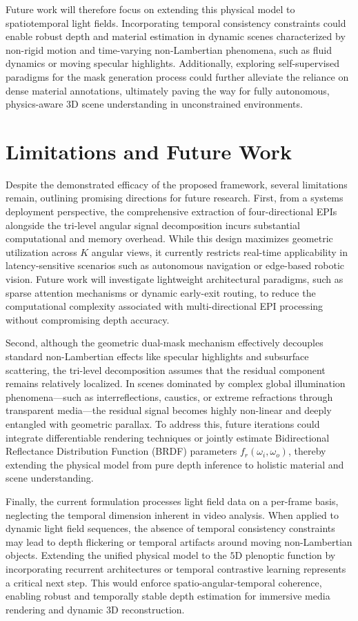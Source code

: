 \documentclass[lettersize,journal]{IEEEtran}
\begin{document}
Future work will therefore focus on extending this physical model to spatiotemporal light fields. Incorporating temporal consistency constraints could enable robust depth and material estimation in dynamic scenes characterized by non-rigid motion and time-varying non-Lambertian phenomena, such as fluid dynamics or moving specular highlights. Additionally, exploring self-supervised paradigms for the mask generation process could further alleviate the reliance on dense material annotations, ultimately paving the way for fully autonomous, physics-aware 3D scene understanding in unconstrained environments.

\section{Limitations and Future Work}

Despite the demonstrated efficacy of the proposed framework, several limitations remain, outlining promising directions for future research. First, from a systems deployment perspective, the comprehensive extraction of four-directional EPIs alongside the tri-level angular signal decomposition incurs substantial computational and memory overhead. While this design maximizes geometric utilization across $K$ angular views, it currently restricts real-time applicability in latency-sensitive scenarios such as autonomous navigation or edge-based robotic vision. Future work will investigate lightweight architectural paradigms, such as sparse attention mechanisms or dynamic early-exit routing, to reduce the computational complexity associated with multi-directional EPI processing without compromising depth accuracy.

Second, although the geometric dual-mask mechanism effectively decouples standard non-Lambertian effects like specular highlights and subsurface scattering, the tri-level decomposition assumes that the residual component remains relatively localized. In scenes dominated by complex global illumination phenomena---such as interreflections, caustics, or extreme refractions through transparent media---the residual signal becomes highly non-linear and deeply entangled with geometric parallax. To address this, future iterations could integrate differentiable rendering techniques or jointly estimate Bidirectional Reflectance Distribution Function (BRDF) parameters $f_r(\omega_i, \omega_o)$, thereby extending the physical model from pure depth inference to holistic material and scene understanding.

Finally, the current formulation processes light field data on a per-frame basis, neglecting the temporal dimension inherent in video analysis. When applied to dynamic light field sequences, the absence of temporal consistency constraints may lead to depth flickering or temporal artifacts around moving non-Lambertian objects. Extending the unified physical model to the $5\text{D}$ plenoptic function by incorporating recurrent architectures or temporal contrastive learning represents a critical next step. This would enforce spatio-angular-temporal coherence, enabling robust and temporally stable depth estimation for immersive media rendering and dynamic 3D reconstruction.
\end{document}
